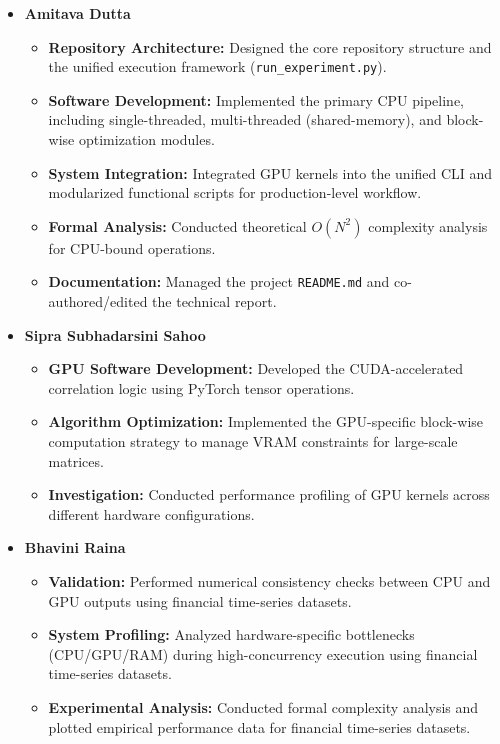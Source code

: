 \begin{itemize}
    \item \textbf{Amitava Dutta}
    \begin{itemize}
        \item \textbf{Repository Architecture:} Designed the core repository structure and the unified execution framework (\texttt{run\_experiment.py}).
        \item \textbf{Software Development:} Implemented the primary CPU pipeline, including single-threaded, multi-threaded (shared-memory), and block-wise optimization modules.
        \item \textbf{System Integration:} Integrated GPU kernels into the unified CLI and modularized functional scripts for production-level workflow.
        \item \textbf{Formal Analysis:} Conducted theoretical $O(N^2)$ complexity analysis for CPU-bound operations.
        \item \textbf{Documentation:} Managed the project \texttt{README.md} and co-authored/edited the technical report.
    \end{itemize}

    \item \textbf{Sipra Subhadarsini Sahoo}
    \begin{itemize}
        \item \textbf{GPU Software Development:} Developed the CUDA-accelerated correlation logic using PyTorch tensor operations.
        \item \textbf{Algorithm Optimization:} Implemented the GPU-specific block-wise computation strategy to manage VRAM constraints for large-scale matrices.
        \item \textbf{Investigation:} Conducted performance profiling of GPU kernels across different hardware configurations.
    \end{itemize}

    \item \textbf{Bhavini Raina}
    \begin{itemize}
        \item \textbf{Validation:} Performed numerical consistency checks between CPU and GPU outputs using financial time-series datasets.
        \item \textbf{System Profiling:} Analyzed hardware-specific bottlenecks (CPU/GPU/RAM) during high-concurrency execution using financial time-series datasets.
        \item \textbf{Experimental Analysis:} Conducted formal complexity analysis and plotted empirical performance data for financial time-series datasets.
    \end{itemize}


\end{itemize}
